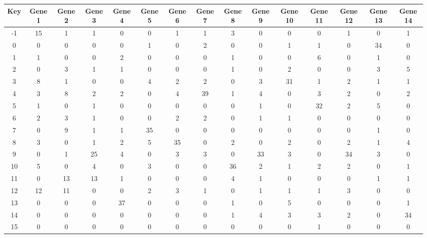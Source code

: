 \begin{tabular}{|c|c|c|c|c|c|c|c|c|c|c|c|c|c|c|}
\hline
Key & Gene 1 & Gene 2 & Gene 3 & Gene 4 & Gene 5 & Gene 6 & Gene 7 & Gene 8 & Gene 9 & Gene 10 & Gene 11 & Gene 12 & Gene 13 & Gene 14 \\
\hline
-1 & 15 & 1 & 1 & 0 & 0 & 1 & 1 & 3 & 0 & 0 & 0 & 1 & 0 & 1 \\
0 & 0 & 0 & 0 & 0 & 1 & 0 & 2 & 0 & 0 & 1 & 1 & 0 & 34 & 0 \\
1 & 1 & 0 & 0 & 2 & 0 & 0 & 0 & 1 & 0 & 0 & 6 & 0 & 1 & 0 \\
2 & 0 & 3 & 1 & 1 & 0 & 0 & 0 & 1 & 0 & 2 & 0 & 0 & 3 & 5 \\
3 & 8 & 1 & 0 & 0 & 4 & 2 & 2 & 0 & 3 & 31 & 1 & 2 & 1 & 1 \\
4 & 3 & 8 & 2 & 2 & 0 & 4 & 39 & 1 & 4 & 0 & 3 & 2 & 0 & 2 \\
5 & 1 & 0 & 1 & 0 & 0 & 0 & 0 & 0 & 1 & 0 & 32 & 2 & 5 & 0 \\
6 & 2 & 3 & 1 & 0 & 0 & 2 & 2 & 0 & 1 & 1 & 0 & 0 & 0 & 0 \\
7 & 0 & 9 & 1 & 1 & 35 & 0 & 0 & 0 & 0 & 0 & 0 & 0 & 1 & 0 \\
8 & 3 & 0 & 1 & 2 & 5 & 35 & 0 & 2 & 0 & 2 & 0 & 2 & 1 & 4 \\
9 & 0 & 1 & 25 & 4 & 0 & 3 & 3 & 0 & 33 & 3 & 0 & 34 & 3 & 0 \\
10 & 5 & 0 & 4 & 0 & 3 & 0 & 0 & 36 & 2 & 1 & 2 & 2 & 0 & 1 \\
11 & 0 & 13 & 13 & 1 & 0 & 0 & 0 & 4 & 1 & 0 & 0 & 0 & 1 & 1 \\
12 & 12 & 11 & 0 & 0 & 2 & 3 & 1 & 0 & 1 & 1 & 1 & 3 & 0 & 0 \\
13 & 0 & 0 & 0 & 37 & 0 & 0 & 0 & 1 & 0 & 5 & 0 & 0 & 0 & 1 \\
14 & 0 & 0 & 0 & 0 & 0 & 0 & 0 & 1 & 4 & 3 & 3 & 2 & 0 & 34 \\
15 & 0 & 0 & 0 & 0 & 0 & 0 & 0 & 0 & 0 & 0 & 1 & 0 & 0 & 0 \\
\hline
\end{tabular}